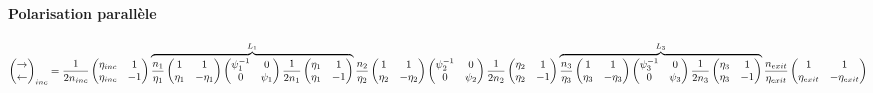 \documentclass[a4paper,english]{article}
\begin{document}
\paragraph{Polarisation parallèle}
\begin{dmath}
\begin{pmatrix}\rightarrow \\ \leftarrow \end{pmatrix}_{inc} =
\frac{1}{2 n_{inc}} \begin{pmatrix} \eta_{inc} & 1 \\ \eta_{inc} & -1 \end{pmatrix} \overbrace{ \frac{n_1}{\eta_1} \begin{pmatrix} 1 & 1 \\ \eta_1 & -\eta_1 \end{pmatrix}
\begin{pmatrix} \psi_1^{-1} & 0 \\ 0 & \psi_1 \end{pmatrix}
\frac{1}{2 n_1} \begin{pmatrix} \eta_1 & 1 \\ \eta_1 & -1 \end{pmatrix} }^{L_1} \frac{n_2}{\eta_2} \begin{pmatrix} 1 & 1 \\ \eta_2 & -\eta_2 \end{pmatrix}
\begin{pmatrix} \psi_2^{-1} & 0 \\ 0 & \psi_2 \end{pmatrix} \\
\frac{1}{2 n_2} \begin{pmatrix} \eta_2 & 1 \\ \eta_2 & -1 \end{pmatrix} \overbrace{ \frac{n_3}{\eta_3} \begin{pmatrix} 1 & 1 \\ \eta_3 & -\eta_3 \end{pmatrix}
\begin{pmatrix} \psi_3^{-1} & 0 \\ 0 & \psi_3 \end{pmatrix}
\frac{1}{2 n_3} \begin{pmatrix} \eta_3 & 1 \\ \eta_3 & -1 \end{pmatrix} }^{L_3} \frac{n_{exit}}{\eta_{exit}} \begin{pmatrix} 1 & 1 \\ \eta_{exit} & -\eta_{exit} \end{pmatrix}

\end{dmath}
\end{document}

